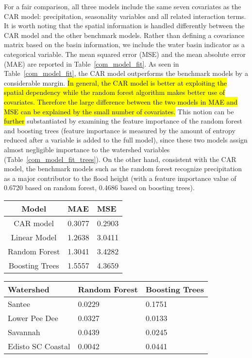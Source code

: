 For a fair comparison, all three models include the same seven covariates as the CAR model: precipitation, seasonality variables and all related interaction terms.
It is worth noting that the spatial information is handled differently between the CAR model and the other benchmark models.
Rather than defining a covariance matrix based on the basin information, we include the water basin indicator as a  categorical variable.
The mean squared error (MSE) and the mean absolute error (MAE) are reported in Table~\ref{com_model_fit}.
As seen in Table~\ref{com_model_fit}, the CAR model outperforms the benchmark models by a considerable margin.
\hl{In general, the CAR model is better at exploiting the spatial dependency while the random forest algorithm makes better use of covariates.
Therefore the large difference between the two models in MAE and MSE can be explained by the small number of covariates.}
This notion can be \hl{further} substantiated by examining the feature importance of the random forest and boosting trees (feature importance  is  measured by the amount of entropy reduced after a variable is added to the full model), since these two models assign almost negligible importance to the watershed variables (Table~\ref{com_model_fit_trees}).
 On the other hand, consistent with the CAR model, the benchmark models such as the random forest recognize  precipitation as a major contributor to the flood  height (with a feature importance value of 0.6720 based on random forest, 0.4686 based on boosting trees).

\begin{table*}[htbp]
\caption{The comparison of the out-of-sample predictions.}
\centering
\begin{tabular}{|c|l|l|}
\hline
Model &  MAE &   MSE \\ \hline
CAR model & 0.3077 &0.2903  \\ \hline
Linear Model &1.2638 &3.0411 \\ \hline
Random Forest &1.3041 & 3.4282  \\ \hline
Boosting Trees &1.5557 &4.3659 \\ \hline
\end{tabular}
\label{com_model_fit}
\end{table*}

\begin{table*}[htbp]
\caption{A comparison of feature importances for random forest model  and boosting trees.}
\centering
\begin{tabular}{|l|l|l|}
\hline
Watershed &  Random Forest &   Boosting Trees \\ \hline
Santee & 0.0229  & 0.1751\\ \hline
Lower Pee Dee & 0.0327 & 0.0133\\ \hline
Savannah  &0.0439   &0.0245\\ \hline
Edisto SC Coastal  &0.0042 &0.0441 \\ \hline
\end{tabular}
\label{com_model_fit_trees}
\end{table*}


